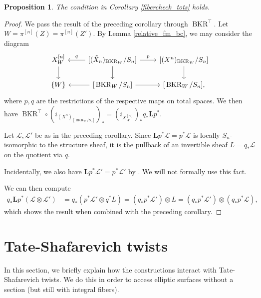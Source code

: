\documentclass{amsart}
\theoremstyle{plain}
\newtheorem{proposition}[theorem]{Proposition}
\theoremstyle{definition}
\theoremstyle{remark}
\begin{document}
    \begin{proposition}
        The condition in Corollary \ref{fibercheck_tots} holds.
    \end{proposition}
    \begin{proof}
        We pass the result of the preceding corollary through $\operatorname{BKR}^\top$.
        Let $W=\pi^{[n]}(Z)=\pi^{[n]}(Z')$.
        By Lemma \ref{relative_fm_bc}, we may consider the diagram
        \[\begin{tikzcd}
            X^{[n]}_W\dar&{[}(\tilde{X}_n)_{\operatorname{BKR}_W}/S_n{]}\rar{p}\lar[swap]{q}\dar&{[}(X^n)_{\operatorname{BKR}_W}/S_n{]}\dar\\
            \{W\}&{[}\operatorname{BKR}_W/S_n{]}\rar\lar&{[}\operatorname{BKR}_W/S_n{]},
        \end{tikzcd}\]
        where $p,q$ are the restrictions of the respective maps on total spaces.
        We then have $\operatorname{BKR}^\top\circ (i_{(X^n)_{[\operatorname{BKR}_W/S_n]}})_\ast=(i_{X^{[n]}_W})_\ast q_\ast\mathbf Lp^\ast$.

        Let $\mathcal L,\mathcal L'$ be as in the preceding corollary.
        Since $\mathbf Lp^\ast\mathcal L=p^\ast\mathcal L$ is locally $S_n$-isomorphic to the structure sheaf, it is the pullback of an invertible sheaf $L=q_\ast\mathcal L$ on the quotient via $q$.

        Incidentally, we also have $\mathbf Lp^\ast\mathcal L'=p^\ast\mathcal L'$ by \cite[Lemma 2.3]{arinkin}.
        We will not formally use this fact.

        We can then compute
        \begin{align*}
            q_\ast\mathbf Lp^\ast(\mathcal L\otimes\mathcal L')&=q_\ast(p^\ast\mathcal L'\otimes q^\ast L)=(q_\ast p^\ast\mathcal L')\otimes L=(q_\ast p^\ast\mathcal L')\otimes(q_\ast p^\ast\mathcal L),
        \end{align*}
        which shows the result when combined with the preceding corollary.
    \end{proof}
    \section{Tate-Shafarevich twists}\label{ss:tatesha}
    In this section, we briefly explain how the constructions interact with Tate-Shafarevich twists.
    We do this in order to access elliptic surfaces without a section (but still with integral fibers).
\end{document}
